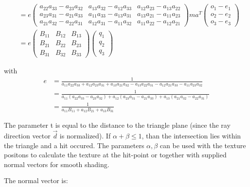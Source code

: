 \documentclass[11pt,a4paper,oneside]{article}
\begin{document}
\begin{align}
&= e \begin{pmatrix} a_{22} a_{33} - a_{23} a_{32} & a_{13} a_{32} - a_{12} a_{33} & a_{12} a_{23} - a_{13} a_{22} \\ a_{23} a_{31} - a_{21} a_{33} & a_{11} a_{33} - a_{13} a_{31} & a_{13} a_{21} - a_{11} a_{23} \\ a_{21} a_{32} - a_{22} a_{31} & a_{12} a_{31} - a_{11} a_{32} & a_{11} a_{22} - a_{12} a_{21} \end{pmatrix}ma ^T \begin{pmatrix} o_1 - e_1 \\ o_2 - e_2 \\ o_3 - e_3 \end{pmatrix} \\
&= e \begin{pmatrix} B_{11} & B_{12} & B_{13} \\ B_{21} & B_{22} & B_{23} \\ B_{31} & B_{32} & B_{33} \end{pmatrix} \begin{pmatrix} q_1 \\ q_2 \\ q_3 \end{pmatrix}
\end{align}

with
\begin{align}
e &= \frac{1}{ a_{11} a_{22} a_{33} + a_{12} a_{23} a_{31} + a_{13} a_{21} a_{32} - a_{13} a_{22} a_{31} - a_{12} a_{21} a_{33} - a_{11} a_{23} a_{32} } \\
&= \frac{1}{ a_{11} (a_{22} a_{33} - a_{23} a_{32}) + a_{12} (a_{23} a_{31} - a_{21} a_{33} ) + a_{13} (a_{21} a_{32} - a_{22} a_{31}) } \\
&= \frac{1}{ a_{11} B_{11} + a_{12} B_{21} + a_{13} B_{31} }
\end{align}

The parameter t is equal to the distance to the triangle plane (since the ray direction vector $\vec{d}$ is normalized). If $\alpha + \beta \leqslant 1$, than the intersection lies within the triangle and a hit occured. The parameters $\alpha, \beta$ can be used with the texture positons to calculate the texture at the hit-point or together with supplied normal vectors for smooth shading.

The normal vector is:
\end{document}
